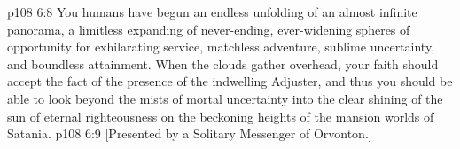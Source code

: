 \pc \vs p108 6:8 You humans have begun an endless unfolding of an almost infinite panorama, a limitless expanding of never\hyp{}ending, ever\hyp{}widening spheres of opportunity for exhilarating service, matchless adventure, sublime uncertainty, and boundless attainment. When the clouds gather overhead, your faith should accept the fact of the presence of the indwelling Adjuster, and thus you should be able to look beyond the mists of mortal uncertainty into the clear shining of the sun of eternal righteousness on the beckoning heights of the mansion worlds of Satania.
\vsetoff
\vs p108 6:9 [Presented by a Solitary Messenger of Orvonton.]
